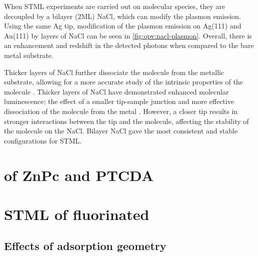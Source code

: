 \begin{figure} [h]
    \centering
    \caption{}
    \label{fig:opv:metal-plasmon}
\end{figure}



When \ac{STML} experiments are carried out on molecular species, they are decoupled by a bilayer (2\ac{ML}) NaCl, which can modify the plasmon emission. Using the same Ag tip, modification of the plasmon emission on Ag(111) and Au(111) by layers of NaCl can be seen in \autoref{fig:opv:nacl-plasmon}. Overall, there is an enhancement and redshift in the detected photons when compared to the bare metal substrate.


\begin{figure} [h]
    \centering
    \caption{}
    \label{fig:opv:nacl-plasmon}
\end{figure}

Thicker layers of NaCl further dissociate the molecule from the metallic substrate, allowing for a more accurate study of the intrinsic properties of the molecule \citep{repp2005molecules}. Thicker layers of NaCl have demonstrated enhanced molecular luminescence; the effect of a smaller tip-sample junction and more effective dissociation of the molecule from the metal \citep{Zhang2017,Kroger2018}. However, a closer tip results in stronger interactions between the tip and the molecule, affecting the stability of the molecule on the NaCl. Bilayer NaCl gave the most consistent and stable configurations for \ac{STML}.



\section{ of ZnPc and PTCDA}








\section{\ac{STML} of fluorinated }






\subsection{Effects of adsorption geometry}





